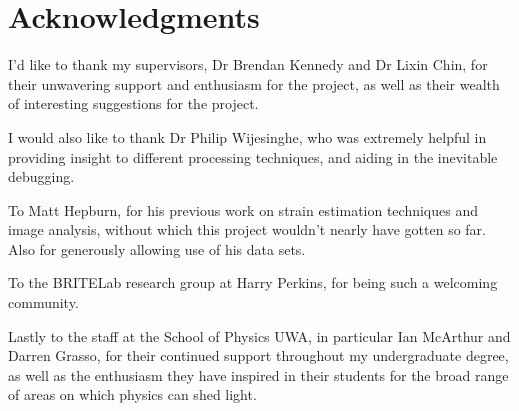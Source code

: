 \chapter*{Acknowledgments}
\thispagestyle{empty}

I'd like to thank my supervisors, Dr Brendan Kennedy and Dr Lixin Chin, for their unwavering support and enthusiasm for the project, as well as their wealth of interesting suggestions for the project. 

I would also like to thank Dr Philip Wijesinghe, who was extremely helpful in providing insight to different processing techniques, and aiding in the inevitable debugging.

To Matt Hepburn, for his previous work on strain estimation techniques and image analysis, without which this project wouldn't nearly have gotten so far. Also for generously allowing use of his data sets. 

To the BRITELab research group at Harry Perkins, for being such a welcoming community. 

Lastly to the staff at the School of Physics UWA, in particular Ian McArthur and Darren Grasso, for their continued support throughout my undergraduate degree, as well as the enthusiasm they have inspired in their students for the broad range of areas on which physics can shed light.

